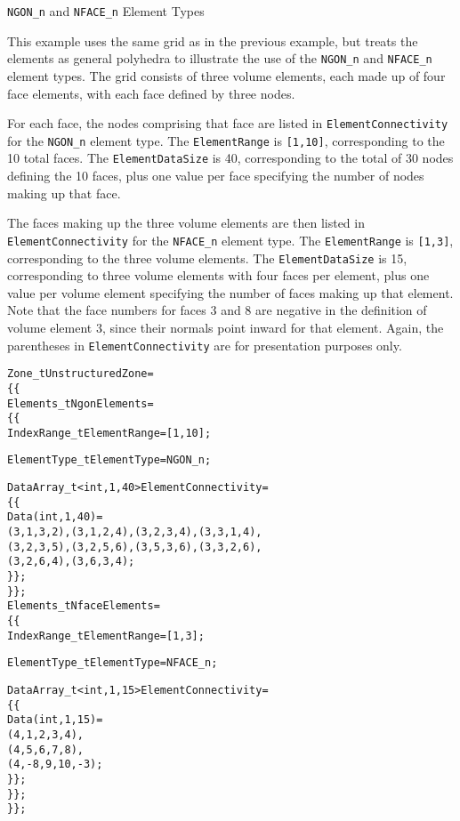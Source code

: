 \begin{example}{\texttt{NGON\_n} and \texttt{NFACE\_n} Element Types}
\label{ex:elements2}

This example uses the same grid as in the previous example, but
treats the elements as general polyhedra to illustrate the use of the
\texttt{NGON\_n} and \texttt{NFACE\_n} element types.
The grid consists of three volume elements, each made up of four face
elements, with each face defined by three nodes.

For each face, the nodes comprising that face are listed in
\texttt{ElementConnectivity} for the \texttt{NGON\_n} element type.
The \texttt{ElementRange} is \texttt{[1,10]}, corresponding to the 10
total faces.
The \texttt{ElementDataSize} is 40, corresponding to the total of 30
nodes defining the 10 faces, plus one value per face specifying the
number of nodes making up that face.

The faces making up the three volume elements are then listed in
\texttt{ElementConnectivity} for the \texttt{NFACE\_n} element type.
The \texttt{ElementRange} is \texttt{[1,3]}, corresponding to the three
volume elements.
The \texttt{ElementDataSize} is 15, corresponding to three volume
elements with four faces per element, plus one value per volume element
specifying the number of faces making up that element.
Note that the face numbers for faces 3 and 8 are negative in the
definition of volume element 3, since their normals point inward for
that element.
Again, the parentheses in \texttt{ElementConnectivity} are for
presentation purposes only.
\begin{alltt}
  Zone\_t UnstructuredZone =
    \{\{
    Elements\_t NgonElements =
      \{\{
      IndexRange\_t ElementRange = [1,10] ;

      ElementType\_t ElementType = NGON\_n ;

      DataArray\_t<int, 1, 40> ElementConnectivity =
        \{\{
        Data(int, 1, 40) =
          (3, 1, 3, 2), (3, 1, 2, 4), (3, 2, 3, 4), (3, 3, 1, 4),
          (3, 2, 3, 5), (3, 2, 5, 6), (3, 5, 3, 6), (3, 3, 2, 6),
          (3, 2, 6, 4), (3, 6, 3, 4) ;
        \}\} ;
      \}\} ;
    Elements\_t NfaceElements =
      \{\{
      IndexRange\_t ElementRange = [1,3] ;

      ElementType\_t ElementType = NFACE\_n ;

      DataArray\_t<int, 1, 15> ElementConnectivity =
        \{\{
        Data(int, 1, 15) =
          (4,  1,  2,  3,  4),
          (4,  5,  6,  7,  8),
          (4, -8,  9, 10, -3) ;
        \}\} ;
      \}\} ;
    \}\} ;
\end{alltt}
\end{example}

